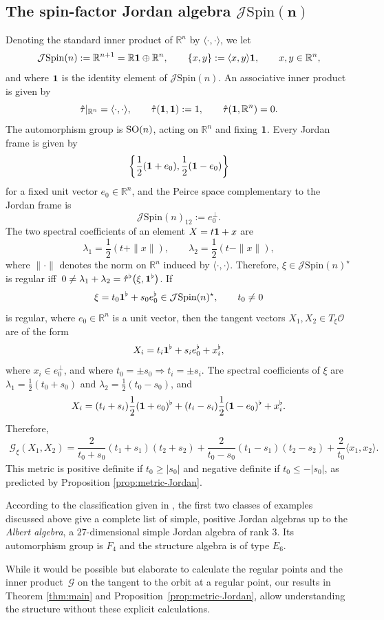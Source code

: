 \documentclass[10pt,a4paper]{amsart}
\numberwithin{equation}{section}
\newcommand{\ocal}{\mathcal{O}}
\newcommand{\R}{{\mathbb R}}
\newcommand{\Jspin}{{\mathcal{J}\mathrm{Spin}}}
\newcommand{\Gcal}{\mathcal{G}}
\begin{document}
\subsection[The spin-factor Jordan algebra Jspin(n)]{The spin-factor Jordan algebra $\boldsymbol{\Jspin(n)}$}

Denoting the standard inner product of $\R^n$ by $\langle \cdot, \cdot \rangle$, we let
\[
\Jspin(n) := \R^{n+1} = \R {\bf 1} \oplus \R^n, \qquad \{x,y\} := \langle x,y\rangle {\bf 1}, \qquad x,y \in \R^n,
\]
and where ${\bf 1}$ is the identity element of $\Jspin(n)$. An associative inner product is given by
\[
\hat \tau|_{\R^n} = \langle \cdot, \cdot \rangle, \qquad \hat \tau({\bf 1}, {\bf 1}) := 1, \qquad \hat \tau({\bf 1}, \R^n) = 0.
\]
The automorphism group is ${\rm SO}(n)$, acting on $\R^n$ and fixing ${\bf 1}$. Every Jordan frame is given by
\[
\left\{ \dfrac12({\bf 1} + e_0), \dfrac12 ({\bf 1} - e_0)\right\}
\]
for a fixed unit vector $e_0 \in \R^n$, and the Peirce space complementary to the Jordan frame is
\[
\Jspin(n)_{12} := e_0^\perp.
\]
The two spectral coefficients of an element $X = t {\bf 1} + x$ are
\[
\lambda_1 = \frac 12 (t+ \|x\|), \qquad \lambda_2 = \frac 12 (t- \|x\|),
\]
where $\|\cdot\|$ denotes the norm on $\R^n$ induced by $\langle \cdot, \cdot \rangle$. Therefore, $\xi \in \Jspin(n)^\star$ is regular iff~$0 \neq \lambda_1 + \lambda_2 = \hat \tau^\flat\big(\xi, {\bf 1}^\flat\big)$. If
\[
\xi = t_0 {\bf 1}^\flat + s_0 e_0^\flat \in \Jspin(n)^\star, \qquad t_0 \neq 0
\]
is regular, where $e_0 \in \R^n$ is a unit vector, then the tangent vectors $X_1, X_2 \in T_\xi \ocal$ are of the form
\[
X_i = t_i {\bf 1}^\flat + s_i e_0^\flat + x_i^\flat,
\]
where $x_i \in e_0^\perp$, and where $t_0 = \pm s_0 \Rightarrow t_i = \pm s_i$. The spectral coefficients of $\xi$ are $\lambda_1 = \frac12(t_0+s_0)$ and $\lambda_2 = \frac12(t_0-s_0)$, and
\[
X_i = (t_i+s_i) \frac12({\bf 1} + e_0)^\flat + (t_i-s_i) \frac12({\bf 1} - e_0)^\flat + x_i^\flat.
\]
Therefore,
\begin{align*}
\Gcal_\xi(X_1, X_2) = \dfrac 2{t_0 + s_0} (t_1 + s_1)(t_2 + s_2) + \dfrac 2{t_0 - s_0} (t_1 - s_1)(t_2 - s_2) + \dfrac2{t_0} \langle x_1, x_2 \rangle.
\end{align*}
This metric is positive definite if $t_0 \geq |s_0|$ and negative definite if $t_0 \leq -|s_0|$, as predicted by Proposition \ref{prop:metric-Jordan}.

\begin{Remark}
According to the classification given in \cite[Theorem V.3.7]{F-K-1994}, the first two classes of examples discussed above give a complete list of simple, positive Jordan algebras up to the {\em Albert algebra}, a $27$-dimensional simple Jordan algebra of rank $3$. Its automorphism group is $F_4$ and the structure algebra is of type $E_6$.

While it would be possible but elaborate to calculate the regular points and the inner product~$\Gcal$ on the tangent to the orbit at a regular point, our results in Theorem \ref{thm:main} and Proposition~\ref{prop:metric-Jordan}, allow understanding the structure without these explicit calculations.
\end{Remark}
\end{document}
